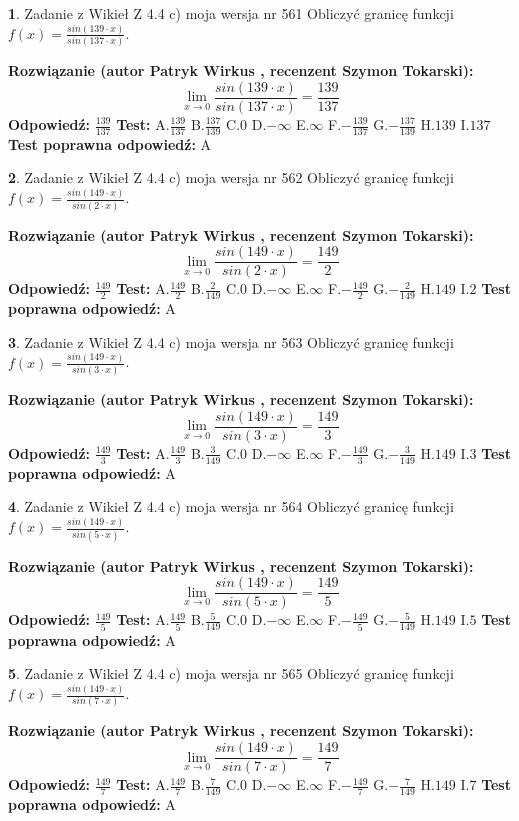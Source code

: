\documentclass[12pt, a4paper]{article}
\theoremstyle{definition} %
\newtheorem{zad}{}
\newcommand{\zadStart}[1]{\begin{zad}#1\newline}
\newcommand{\zadStop}{\end{zad}}
\newcommand{\rozwStart}[2]{\noindent \textbf{Rozwiązanie (autor #1 , recenzent #2): }\newline}
\newcommand{\rozwStop}{\newline}
\newcommand{\odpStart}{\noindent \textbf{Odpowiedź:}\newline}
\newcommand{\odpStop}{\newline}
\newcommand{\testStart}{\noindent \textbf{Test:}\newline}
\newcommand{\testStop}{\newline}
\newcommand{\kluczStart}{\noindent \textbf{Test poprawna odpowiedź:}\newline}
\newcommand{\kluczStop}{\newline}
\begin{document}
\zadStart{Zadanie z Wikieł Z 4.4 c) moja wersja nr 561}
Obliczyć granicę funkcji $f(x)=\frac{sin(139\cdot x)}{sin(137\cdot x)}$.
\zadStop
\rozwStart{Patryk Wirkus}{Szymon Tokarski}
$$\lim\limits_{x\to 0}\frac{sin(139\cdot x)}{sin(137\cdot x)}=
\frac{139}{137}$$
\rozwStop
\odpStart
$\frac{139}{137}$
\odpStop
\testStart
A.$\frac{139}{137}$
B.$\frac{137}{139}$
C.$0$
D.$-\infty$
E.$\infty$
F.$-\frac{139}{137}$
G.$-\frac{137}{139}$
H.$139$
I.$137$
\testStop
\kluczStart
A
\kluczStop



\zadStart{Zadanie z Wikieł Z 4.4 c) moja wersja nr 562}
Obliczyć granicę funkcji $f(x)=\frac{sin(149\cdot x)}{sin(2\cdot x)}$.
\zadStop
\rozwStart{Patryk Wirkus}{Szymon Tokarski}
$$\lim\limits_{x\to 0}\frac{sin(149\cdot x)}{sin(2\cdot x)}=
\frac{149}{2}$$
\rozwStop
\odpStart
$\frac{149}{2}$
\odpStop
\testStart
A.$\frac{149}{2}$
B.$\frac{2}{149}$
C.$0$
D.$-\infty$
E.$\infty$
F.$-\frac{149}{2}$
G.$-\frac{2}{149}$
H.$149$
I.$2$
\testStop
\kluczStart
A
\kluczStop



\zadStart{Zadanie z Wikieł Z 4.4 c) moja wersja nr 563}
Obliczyć granicę funkcji $f(x)=\frac{sin(149\cdot x)}{sin(3\cdot x)}$.
\zadStop
\rozwStart{Patryk Wirkus}{Szymon Tokarski}
$$\lim\limits_{x\to 0}\frac{sin(149\cdot x)}{sin(3\cdot x)}=
\frac{149}{3}$$
\rozwStop
\odpStart
$\frac{149}{3}$
\odpStop
\testStart
A.$\frac{149}{3}$
B.$\frac{3}{149}$
C.$0$
D.$-\infty$
E.$\infty$
F.$-\frac{149}{3}$
G.$-\frac{3}{149}$
H.$149$
I.$3$
\testStop
\kluczStart
A
\kluczStop



\zadStart{Zadanie z Wikieł Z 4.4 c) moja wersja nr 564}
Obliczyć granicę funkcji $f(x)=\frac{sin(149\cdot x)}{sin(5\cdot x)}$.
\zadStop
\rozwStart{Patryk Wirkus}{Szymon Tokarski}
$$\lim\limits_{x\to 0}\frac{sin(149\cdot x)}{sin(5\cdot x)}=
\frac{149}{5}$$
\rozwStop
\odpStart
$\frac{149}{5}$
\odpStop
\testStart
A.$\frac{149}{5}$
B.$\frac{5}{149}$
C.$0$
D.$-\infty$
E.$\infty$
F.$-\frac{149}{5}$
G.$-\frac{5}{149}$
H.$149$
I.$5$
\testStop
\kluczStart
A
\kluczStop



\zadStart{Zadanie z Wikieł Z 4.4 c) moja wersja nr 565}
Obliczyć granicę funkcji $f(x)=\frac{sin(149\cdot x)}{sin(7\cdot x)}$.
\zadStop
\rozwStart{Patryk Wirkus}{Szymon Tokarski}
$$\lim\limits_{x\to 0}\frac{sin(149\cdot x)}{sin(7\cdot x)}=
\frac{149}{7}$$
\rozwStop
\odpStart
$\frac{149}{7}$
\odpStop
\testStart
A.$\frac{149}{7}$
B.$\frac{7}{149}$
C.$0$
D.$-\infty$
E.$\infty$
F.$-\frac{149}{7}$
G.$-\frac{7}{149}$
H.$149$
I.$7$
\testStop
\kluczStart
A
\kluczStop
\end{document}
